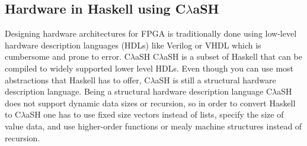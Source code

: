 \documentclass[preprint]{sigplanconf}
\def\clash{C$\lambda$aSH\xspace}
\begin{document}
\subsection{Hardware in Haskell using \clash}
Designing hardware architectures for FPGA is traditionally done using low-level hardware description languages (HDLs) like Verilog or VHDL which is cumbersome and prone to error. \clash 
\clash \cite{Baaij} is a subset of Haskell that can be compiled to widely supported lower level HDLs.
Even though you can use most abstractions that Haskell has to offer, \clash is still a structural hardware description language.
Being a structural hardware description language \clash does not support dynamic data sizes or recursion, so in order to convert Haskell to \clash one has to use fixed size vectors instead of lists, specify the size of value data, and use higher-order functions or mealy machine structures instead of recursion.

\end{document}
